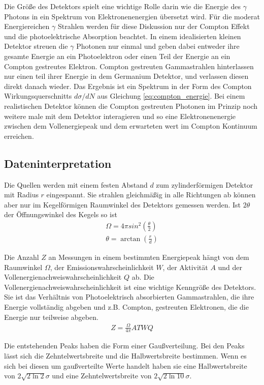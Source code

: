 Die Größe des Detektors spielt eine wichtige Rolle darin wie die Energie des
$\gamma$ Photons in ein Spektrum von Elektronenenergien übersetzt wird. Für die
moderat Energiereichen $\gamma$ Strahlen werden für diese Diskussion nur der
Compton Effekt und die photoelektrische Absorption beachtet. In einem
idealisierten kleinen Detektor streuen die $\gamma$ Photonen nur einmal und
geben dabei entweder ihre gesamte Energie an ein Photoelektron oder einen Teil
der Energie an ein Compton gestreutes Elektron. Compton gestreuten
Gammastrahlen hinterlassen nur einen teil ihrer Energie in dem Germanium
Detektor, und verlassen diesen direkt danach wieder. Das Ergebnis ist ein
Spektrum in der Form des Compton Wirkungsquerschnitts $d\sigma/dN$ aus
Gleichung \eqref{eq:compton_energie}. Bei einem realistischen Detektor können
die Compton gestreuten Photonen im Prinzip noch weitere male mit dem Detektor
interagieren und so eine Elektronenenergie zwischen dem Vollenergiepeak und dem
erwarteten wert im Compton Kontinuum erreichen.

\subsection{Dateninterpretation}

Die Quellen werden mit einem festen Abstand $d$ zum zylinderförmigen Detektor
mit Radius $r$ eingespannt. Sie strahlen gleichmäßig in alle Richtungen ab
können aber nur im Kegelförmigen Raumwinkel des Detektors gemessen werden. Ist
$2\theta$ der Öffnungswinkel des Kegels so ist \cite{wiki:raum}
\begin{align}
	\Omega = 4 \pi sin^2\left(\frac{\theta}{2}\right) \\
	\theta = \arctan \left(\frac{r}{d} \right)
\end{align}\label{eq:raumwinkel}

Die Anzahl $Z$ an Messungen in einem bestimmten Energiepeak hängt von dem
Raumwinkel $\Omega$, der Emissionswahrscheinlichkeit $W$, der Aktivität $A$ und
der Vollenergienachweiswahrscheinlichkeit $Q$ ab. Die
Vollenergienachweiswahrscheinlichkeit ist eine wichtige Kenngröße des
Detektors. Sie ist das Verhältnis von Photoelektrisch absorbierten
Gammastrahlen, die ihre Energie vollständig abgeben und z.B. Compton,
gestreuten Elektronen, die die Energie nur teilweise abgeben.
\begin{align}
	Z = \frac{\Omega}{4\pi} A T W Q
	\label{eq:Q}
\end{align}

Die entstehenden Peaks haben die Form einer Gaußverteilung. Bei den Peaks lässt
sich die Zehntelwertsbreite und die Halbwertsbreite bestimmen. Wenn es sich bei
diesen um gaußverteilte Werte handelt haben sie eine Halbwertsbreite von
$2\sqrt{2\ln 2} \sigma$ und eine Zehntelwertsbreite von $2 \sqrt{2\ln
		10}\sigma$.


